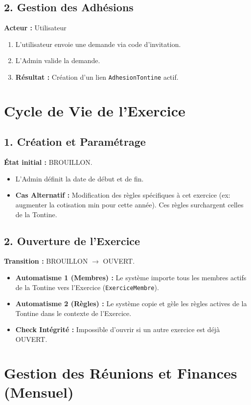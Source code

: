 \documentclass[12pt,a4paper]{report}
\begin{document}
\section{2. Gestion des Adhésions}
\textbf{Acteur :} Utilisateur
\begin{enumerate}
    \item L'utilisateur envoie une demande via code d'invitation.
    \item L'Admin valide la demande.
    \item \textbf{Résultat :} Création d'un lien \texttt{AdhesionTontine} actif.
\end{enumerate}

\chapter{Cycle de Vie de l'Exercice}

\section{1. Création et Paramétrage}
\textbf{État initial :} BROUILLON.
\begin{itemize}
    \item L'Admin définit la date de début et de fin.
    \item \textbf{Cas Alternatif :} Modification des règles spécifiques à cet exercice (ex: augmenter la cotisation min pour cette année). Ces règles surchargent celles de la Tontine.
\end{itemize}

\section{2. Ouverture de l'Exercice}
\textbf{Transition :} BROUILLON $\rightarrow$ OUVERT.
\begin{itemize}
    \item \textbf{Automatisme 1 (Membres) :} Le système importe tous les membres actifs de la Tontine vers l'Exercice (\texttt{ExerciceMembre}).
    \item \textbf{Automatisme 2 (Règles) :} Le système copie et gèle les règles actives de la Tontine dans le contexte de l'Exercice.
    \item \textbf{Check Intégrité :} Impossible d'ouvrir si un autre exercice est déjà OUVERT.
\end{itemize}

\chapter{Gestion des Réunions et Finances (Mensuel)}
\end{document}
